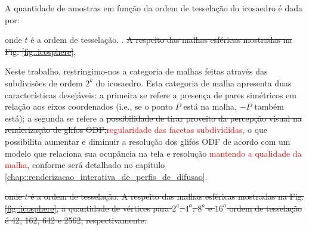 \documentclass[
    12pt,                %
    oneside,            %
    a4paper,            %
    english,            %
    french,                %
    spanish,            %
    brazil                %
    ]{abntex2}
\begin{document}

A quantidade de amostras em função da ordem de tesselação do icosaedro é dada por:

onde $t$ é a ordem de tesselação. \textcolor{red}{.} \sout{A respeito das malhas esféricas mostradas na Fig. \ref{fig::icosphere}}, 




Neste trabalho, restringimo-nos a categoria de malhas feitas através das subdivisões de ordem $2^k$ do icosaedro. Esta categoria de malha apresenta duas características desejáveis: a primeira se refere a presença de pares simétricos em relação aos eixos coordenados (i.e., se o ponto $P$ está na malha, $-P$ também está); a segunda se refere a \sout{possibilidade de tirar proveito da percepção visual na renderização de glifos ODF,}\textcolor{red}{regularidade das facetas subdivididas,} o que possibilita aumentar e diminuir a resolução dos glifos ODF de acordo com um modelo que relaciona sua ocupância na tela e resolução \textcolor{red}{mantendo a qualidade da malha}, conforme será detalhado no capítulo \ref{chap::renderizacao_interativa_de_perfis_de_difusao}.

\sout{onde $t$ é a ordem de tesselação. A respeito das malhas esféricas mostradas na Fig. \ref{fig::icosphere}, a quantidade de vértices para $2^a$, $4^a$, $8^a$ e $16^a$ ordem de tesselação é 42, 162, 642 e 2562, respectivamente.}
\end{document}
